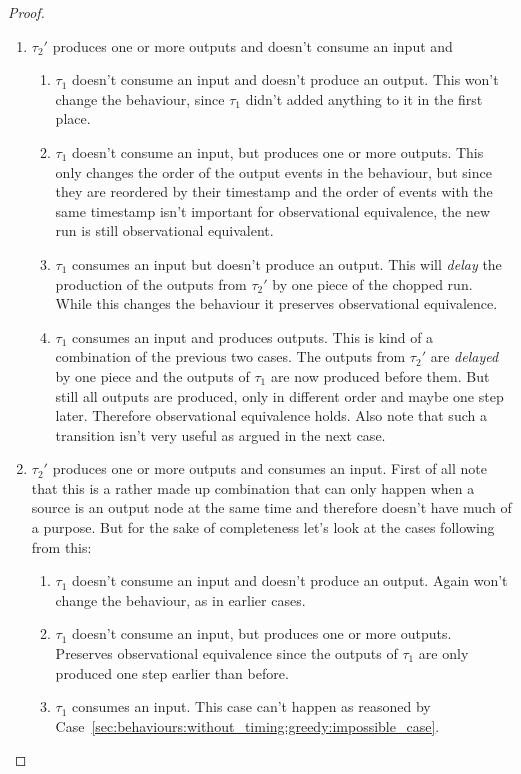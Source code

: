 \begin{proof}
\begin{enumerate}
      \item \(\tau_2'\) produces one or more outputs and doesn't consume an input and
        \begin{enumerate}
          \item \(\tau_1\) doesn't consume an input and doesn't produce an output. This won't change the behaviour, since \(\tau_1\) didn't added anything to it in the first place.
          \item \(\tau_1\) doesn't consume an input, but produces one or more outputs. This only changes the order of the output events in the behaviour, but since they are reordered by their timestamp and the order of events with the same timestamp isn't important for observational equivalence, the new run is still observational equivalent.
          \item \(\tau_1\) consumes an input but doesn't produce an output. This will \emph{delay} the production of the outputs from \(\tau_2'\) by one piece of the chopped run. While this changes the behaviour it preserves observational equivalence.
          \item \(\tau_1\) consumes an input and produces outputs. This is kind of a combination of the previous two cases. The outputs from \(\tau_2'\) are \emph{delayed} by one piece and the outputs of \(\tau_1\) are now produced before them. But still all outputs are produced, only in different order and maybe one step later. Therefore observational equivalence holds. Also note that such a transition isn't very useful as argued in the next case.
        \end{enumerate}
      \item \(\tau_2'\) produces one or more outputs and consumes an input. First of all note that this is a rather made up combination that can only happen when a source is an output node at the same time and therefore doesn't have much of a purpose. But for the sake of completeness let's look at the cases following from this:
        \begin{enumerate}
          \item \(\tau_1\) doesn't consume an input and doesn't produce an output. Again won't change the behaviour, as in earlier cases.
          \item\label{sec:behaviours:without_timing:greedy:non_greedy_2} \(\tau_1\) doesn't consume an input, but produces one or more outputs. Preserves observational equivalence since the outputs of \(\tau_1\) are only produced one step earlier than before.
          \item \(\tau_1\) consumes an input. This case can't happen as reasoned by Case~\ref{sec:behaviours:without_timing:greedy:impossible_case}.
        \end{enumerate}
    \end{enumerate}


\end{proof}
